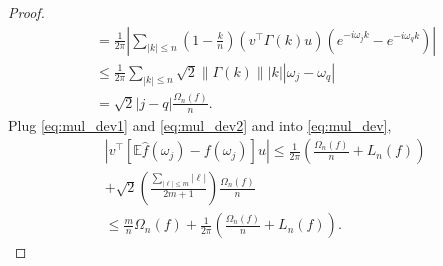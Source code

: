 \begin{proof}
\begin{equation}
\begin{aligned}
&= \frac{1}{2\pi}\left|\sum_{|k|\le n} \left(1-\frac{k}{n}\right) (v^\top \Gamma(k)u) (e^{-i\omega_jk} - e^{-i\omega_qk})\right|\\
&\le \frac{1}{2\pi} \sum_{|k|\le n} \sqrt{2} \|\Gamma(k)\| |k||\omega_j - \omega_q| \\
&= \sqrt{2} |j-q| \frac{\Omega_n(f)}{n}. 
\end{aligned}
\end{equation}
Plug \eqref{eq:mul_dev1} and \eqref{eq:mul_dev2} and into \eqref{eq:mul_dev},  
\begin{equation}
\begin{aligned}
&\left|v^\top \left[\mathbb{E}\hat{f}(\omega_j) - f(\omega_j)\right]u\right| \le \frac{1}{2\pi}\left(\frac{\Omega_n(f)}{n} + L_n(f)\right)\\
&+\sqrt{2} \left(\frac{\sum_{|\ell|\le m} |\ell|}{2m+1}\right)\frac{\Omega_n(f)}{n}\\
&\le \frac{m}{n}\Omega_n(f) + \frac{1}{2\pi}\left(\frac{\Omega_n(f)}{n}+L_n(f)\right).
\end{aligned}
\end{equation}
\end{proof}
\fi

